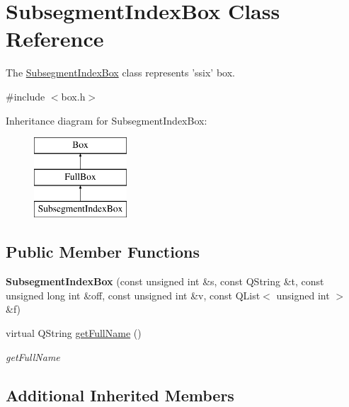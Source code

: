 \hypertarget{class_subsegment_index_box}{\section{Subsegment\-Index\-Box Class Reference}
\label{class_subsegment_index_box}
}


The \hyperlink{class_subsegment_index_box}{Subsegment\-Index\-Box} class represents 'ssix' box.  




{\ttfamily \#include $<$box.\-h$>$}

Inheritance diagram for Subsegment\-Index\-Box\-:\begin{figure}[H]
\begin{center}
\leavevmode
\includegraphics[height=3.000000cm]{class_subsegment_index_box}
\end{center}
\end{figure}
\subsection*{Public Member Functions}
\begin{DoxyCompactItemize}
\item 
\hypertarget{class_subsegment_index_box_a3afa846a3f17f37e754d17cd88baffd9}{{\bfseries Subsegment\-Index\-Box} (const unsigned int \&s, const Q\-String \&t, const unsigned long int \&off, const unsigned int \&v, const Q\-List$<$ unsigned int $>$ \&f)}\label{class_subsegment_index_box_a3afa846a3f17f37e754d17cd88baffd9}

\item 
virtual Q\-String \hyperlink{class_subsegment_index_box_ae476be69002235154639a5fe938eff60}{get\-Full\-Name} ()
\begin{DoxyCompactList}\small\item\em get\-Full\-Name \end{DoxyCompactList}\end{DoxyCompactItemize}
\subsection*{Additional Inherited Members}


